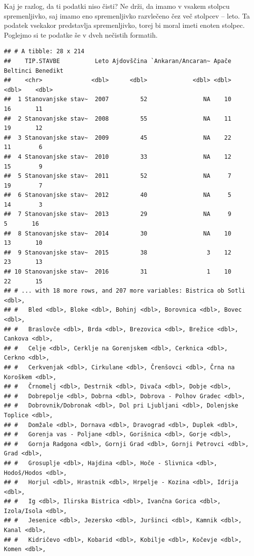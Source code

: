 \documentclass[
]{book}
\begin{document}
Kaj je razlog, da ti podatki niso čisti? Ne drži, da imamo v vsakem stolpcu spremenljivko, saj imamo eno spremenljivko razvlečeno čez več stolpcev -- leto. Ta podatek vsekakor predstavlja spremenljivko, torej bi moral imeti enoten stolpec. Poglejmo si te podatke še v dveh nečistih formatih.

\begin{verbatim}
## # A tibble: 28 x 214
##    TIP.STAVBE          Leto Ajdovščina `Ankaran/Ancaran~ Apače Beltinci Benedikt
##    <chr>              <dbl>      <dbl>             <dbl> <dbl>    <dbl>    <dbl>
##  1 Stanovanjske stav~  2007         52                NA    10       16       11
##  2 Stanovanjske stav~  2008         55                NA    11       19       12
##  3 Stanovanjske stav~  2009         45                NA    22       11        6
##  4 Stanovanjske stav~  2010         33                NA    12       15        9
##  5 Stanovanjske stav~  2011         52                NA     7       19        7
##  6 Stanovanjske stav~  2012         40                NA     5       14        3
##  7 Stanovanjske stav~  2013         29                NA     9        5       16
##  8 Stanovanjske stav~  2014         30                NA    10       13       10
##  9 Stanovanjske stav~  2015         38                 3    12       23       13
## 10 Stanovanjske stav~  2016         31                 1    10       22       15
## # ... with 18 more rows, and 207 more variables: Bistrica ob Sotli <dbl>,
## #   Bled <dbl>, Bloke <dbl>, Bohinj <dbl>, Borovnica <dbl>, Bovec <dbl>,
## #   Braslovče <dbl>, Brda <dbl>, Brezovica <dbl>, Brežice <dbl>, Cankova <dbl>,
## #   Celje <dbl>, Cerklje na Gorenjskem <dbl>, Cerknica <dbl>, Cerkno <dbl>,
## #   Cerkvenjak <dbl>, Cirkulane <dbl>, Črenšovci <dbl>, Črna na Koroškem <dbl>,
## #   Črnomelj <dbl>, Destrnik <dbl>, Divača <dbl>, Dobje <dbl>,
## #   Dobrepolje <dbl>, Dobrna <dbl>, Dobrova - Polhov Gradec <dbl>,
## #   Dobrovnik/Dobronak <dbl>, Dol pri Ljubljani <dbl>, Dolenjske Toplice <dbl>,
## #   Domžale <dbl>, Dornava <dbl>, Dravograd <dbl>, Duplek <dbl>,
## #   Gorenja vas - Poljane <dbl>, Gorišnica <dbl>, Gorje <dbl>,
## #   Gornja Radgona <dbl>, Gornji Grad <dbl>, Gornji Petrovci <dbl>, Grad <dbl>,
## #   Grosuplje <dbl>, Hajdina <dbl>, Hoče - Slivnica <dbl>, Hodoš/Hodos <dbl>,
## #   Horjul <dbl>, Hrastnik <dbl>, Hrpelje - Kozina <dbl>, Idrija <dbl>,
## #   Ig <dbl>, Ilirska Bistrica <dbl>, Ivančna Gorica <dbl>, Izola/Isola <dbl>,
## #   Jesenice <dbl>, Jezersko <dbl>, Juršinci <dbl>, Kamnik <dbl>, Kanal <dbl>,
## #   Kidričevo <dbl>, Kobarid <dbl>, Kobilje <dbl>, Kočevje <dbl>, Komen <dbl>,

\end{verbatim}
\end{document}
